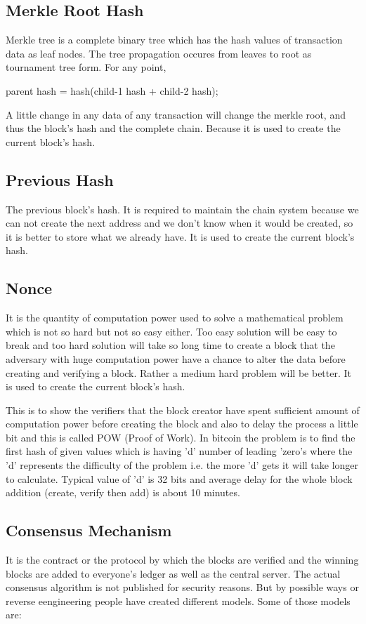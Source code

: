 \subsection{Merkle Root Hash}
Merkle tree is a complete binary tree which has the hash values of transaction data as leaf nodes. The tree propagation occures from leaves to root as tournament tree form. For any point,

			parent hash = hash(child-1 hash + child-2 hash);

A little change in any data of any transaction will change the merkle root, and thus the block's hash and the complete chain. Because it is used to create the current block's hash.



\subsection{Previous Hash}
The previous block's hash. It is required to maintain the chain system because we can not create the next address and we don't know when it would be created, so it is better to store what we already have. It is used to create the current block's hash.

\subsection{Nonce}
It is the quantity of computation power used to solve a mathematical problem which is not so hard but not so easy either. Too easy solution will be easy to break and too hard solution will take so long time to create a block that the adversary with huge computation power have a chance to alter the data before creating and verifying a block. Rather a medium hard problem will be better. It is used to create the current block's hash.

This is to show the verifiers that the block creator have spent sufficient amount of computation power before creating the block and also to delay the process a little bit and this is called POW (Proof of Work). In bitcoin the problem is to find the first hash of given values which is having 'd' number of leading 'zero's where the 'd' represents the difficulty of the problem i.e. the more 'd' gets it will take longer to calculate. Typical value of 'd' is 32 bits and average delay for the whole block addition (create, verify then add) is about 10 minutes.

\subsection{Consensus Mechanism}
It is the contract or the protocol by which the blocks are verified and the winning blocks are added to everyone's ledger as well as the central server. The actual consensus algorithm is not published for security reasons. But by possible ways or reverse eengineering people have created  different models. Some of those models are:

